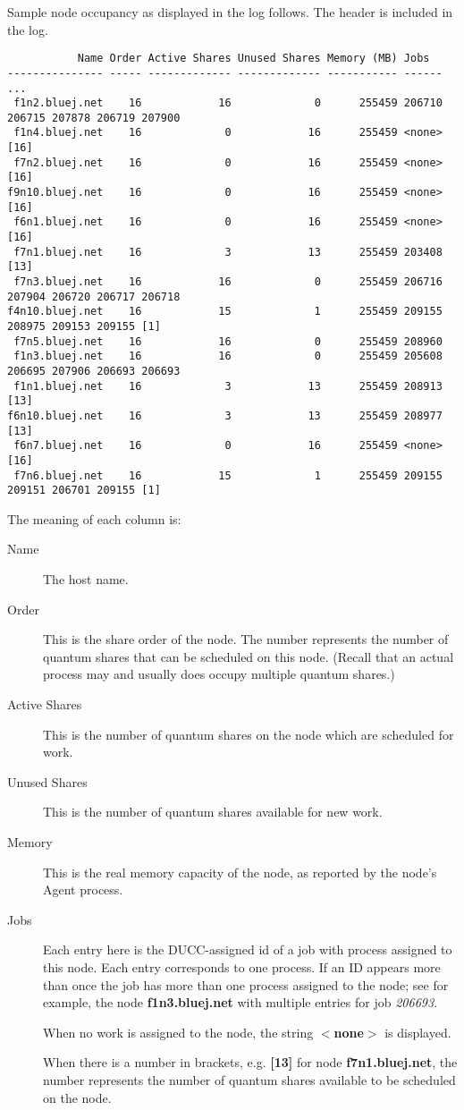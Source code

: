     Sample node occupancy as displayed in the log follows.  The header is included in the log.
\begin{verbatim}
           Name Order Active Shares Unused Shares Memory (MB) Jobs
--------------- ----- ------------- ------------- ----------- ------ ...
 f1n2.bluej.net    16            16             0      255459 206710 206715 207878 206719 207900
 f1n4.bluej.net    16             0            16      255459 <none>[16]
 f7n2.bluej.net    16             0            16      255459 <none>[16]
f9n10.bluej.net    16             0            16      255459 <none>[16]
 f6n1.bluej.net    16             0            16      255459 <none>[16]
 f7n1.bluej.net    16             3            13      255459 203408 [13]
 f7n3.bluej.net    16            16             0      255459 206716 207904 206720 206717 206718 
f4n10.bluej.net    16            15             1      255459 209155 208975 209153 209155 [1]
 f7n5.bluej.net    16            16             0      255459 208960 
 f1n3.bluej.net    16            16             0      255459 205608 206695 207906 206693 206693 
 f1n1.bluej.net    16             3            13      255459 208913 [13]
f6n10.bluej.net    16             3            13      255459 208977 [13]
 f6n7.bluej.net    16             0            16      255459 <none> [16]
 f7n6.bluej.net    16            15             1      255459 209155 209151 206701 209155 [1]
\end{verbatim}

    The meaning of each column is:
    \begin{description}
      \item[Name] The host name.
      \item[Order] This is the share order of the node.  The number represents the number of quantum shares
        that can be scheduled on this node. (Recall that an actual process may and usually does
        occupy multiple quantum shares.)
      \item[Active Shares] This is the number of quantum shares on the node which are scheduled
        for work.
      \item[Unused Shares] This is the number of quantum shares available for new work.
      \item[Memory] This is the real memory capacity of the node, as reported by the node's
        Agent process.
      \item[Jobs] Each entry here is the DUCC-assigned id of a job with process assigned to
        this node.  Each entry corresponds to one process.  If an ID appears more than 
        once the job has more than one process assigned to the node; see for example, the
        node {\bf f1n3.bluej.net} with multiple entries for job {\em 206693}.

        When no work is assigned to the node, the string {\bf $<$none$>$} is displayed.  
        
        When there is a number in brackets, e.g. {\bf [13]} for node {\bf f7n1.bluej.net}, the
        number represents the number of quantum shares available to be scheduled on the node.
    \end{description}

